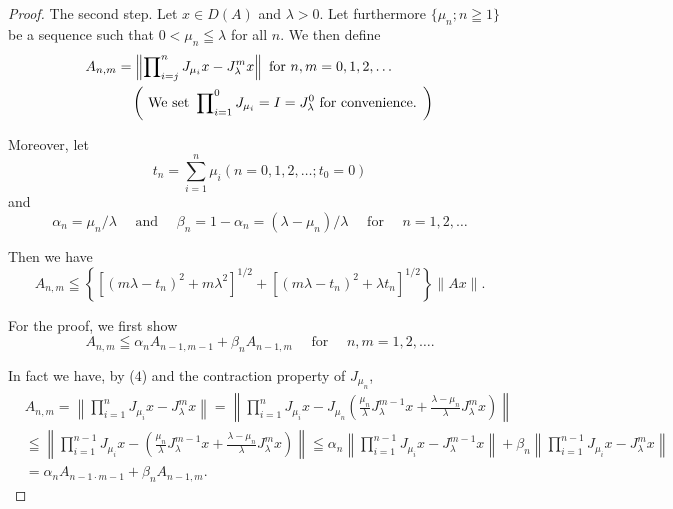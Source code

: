 \begin{proof}
The second step. Let $x \in D(A)$ and $\lambda > 0$. Let furthermore $\{\mu_n; n \geqq 1\}$ be a sequence such that $0 < \mu_n \leqq \lambda$ for all $n$. We then define 
\begin{align}
A _{n,m}& = \left\| \prod\limits_{i=j} ^{n} J _ {\mu_{i}} x - J _{\lambda} ^{m} x \right\| \text{ for } n, m = 0, 1, 2, \dots \label{eq:XIV.7.5} \\
&\quad \left(\text{ We set } \prod\limits_{i=1} ^{0} J _ {\mu_{i}} = I = J _{\lambda} ^{0} \text{ for convenience. }\right) \notag
\end{align}

Moreover, let 
\begin{equation}\label{eq:XIV.7.6}
t _{n} = \sum\limits_{i=1} ^{n} \mu_{i} (n = 0, 1, 2, \dots ; t _{0} = 0)
\end{equation}
and 
\begin{equation}\label{eq:XIV.7.7}
\alpha_{n} = \mu_{n} / \lambda \quad \text{ and } \quad \beta_{n} = 1 - \alpha_{n} = (\lambda - \mu_{n}) / \lambda \quad \text{ for } \quad n = 1, 2, \dots
\end{equation}

Then we have 
\begin{equation}\label{eq:XIV.7.8}
A _{n,m} \leqq \left\{\left[ (m \lambda - t _{n}) ^{2} + m \lambda^{2} \right] ^{1/2} + \left[ (m \lambda - t _{n}) ^{2} + \lambda t _{n} \right] ^{1/2} \right\} \| A x \|.
\end{equation}

For the proof, we first show 
\begin{equation}\label{eq:XIV.7.9}
A _{n,m} \leqq \alpha_{n} A _{n-1,m-1} + \beta_{n} A _{n-1,m} \quad \text{ for } \quad n, m = 1, 2, \dots .
\end{equation}

In fact we have, by ($4$) and the contraction property of $J_{\mu_{n}}$, 
\[
\begin{aligned}
&A _{n,m} = \left\| \prod\limits_{i=1} ^{n} J _ {\mu_{i}} x - J _{\lambda} ^{m} x \right\| = \left\| \prod\limits_{i=1} ^{n} J _ {\mu_{i}} x - J _ {\mu_{n}} \left(\frac {\mu_{n}}{\lambda} J _{\lambda} ^{m-1} x + \frac {\lambda - \mu_{n}}{\lambda} J _{\lambda} ^{m} x\right) \right\|
\\
&\leqq \left\| \prod\limits_{i=1} ^{n-1} J _ {\mu_{i}} x - \left(\frac {\mu_{n}}{\lambda} J _{\lambda} ^{m-1} x + \frac {\lambda - \mu_{n}}{\lambda} J _{\lambda} ^{m} x\right) \right\| \leqq \alpha_{n} \left\| \prod\limits_{i=1} ^{n-1} J _ {\mu_{i}} x - J _{\lambda} ^{m-1} x \right\| + \beta_{n} \left\| \prod\limits_{i=1} ^{n-1} J _ {\mu_{i}} x - J _{\lambda} ^{m} x \right\|
\\
&= \alpha_{n} A _{n -1 \cdot m -1} + \beta_{n} A _{n-1,m}.
\end{aligned}
\]


\end{proof}
